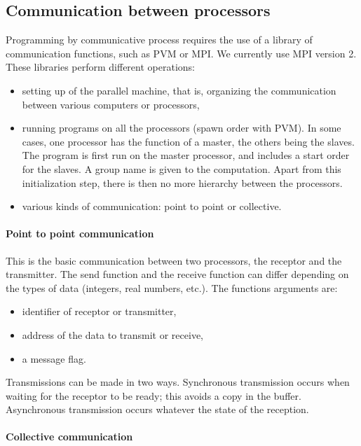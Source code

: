 \subsection{Communication between processors}

Programming by communicative process requires the use of a library of
communication functions, such as PVM or MPI. We currently use MPI version 2.
These libraries perform different operations:
\begin{itemize}
  \item setting up of the parallel machine, that is, organizing the
    communication between various computers or processors,
  \item running programs on all the processors (spawn order with PVM).  In some
    cases, one processor has the function of a master, the others being the
    slaves. The program is first run on the master processor, and includes a
    start order for the slaves. A group name is given to the computation. Apart
    from this initialization step, there is then no more hierarchy between the
    processors.
  \item various kinds of communication: point to point or collective.
\end{itemize}

\paragraph{Point to point communication}

This is the basic communication between two processors, the receptor and the
transmitter. The send function and the receive function can differ depending on
the types of data (integers, real numbers, etc.). The functions arguments are:
\begin{itemize}
  \item identifier of receptor or transmitter,
  \item address of the data to transmit or receive,
  \item a message flag.
\end{itemize}
Transmissions can be made in two ways. Synchronous transmission occurs when
waiting for the receptor to be ready; this avoids a copy in the buffer.
Asynchronous transmission occurs whatever the state of the reception.

\paragraph{Collective communication}

